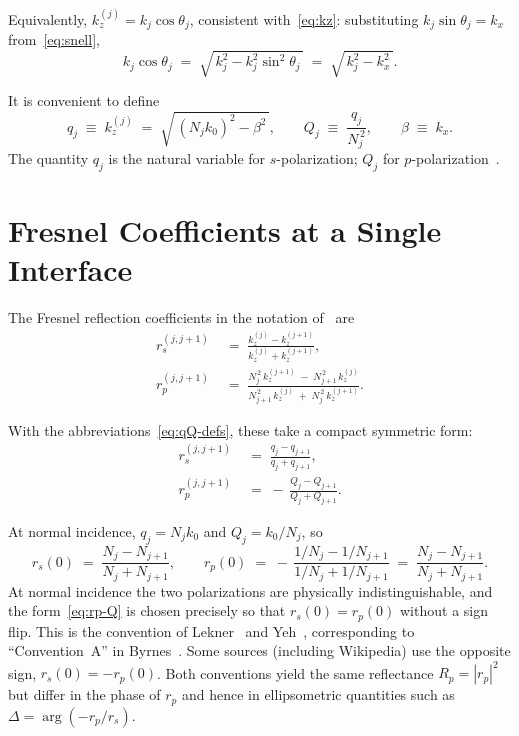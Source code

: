 \documentclass[aps,prb,onecolumn,superscriptaddress,nofootinbib,11pt]{revtex4-2}
\begin{document}
Equivalently, $k_z^{(j)} = k_j\cos\theta_j$, consistent with~\eqref{eq:kz}: substituting $k_j\sin\theta_j = k_x$ from~\eqref{eq:snell},
\begin{equation}
  k_j \cos\theta_j \;=\; \sqrt{\,k_j^2 - k_j^2 \sin^2\theta_j\,} \;=\; \sqrt{\,k_j^2 - k_x^2\,}.
\end{equation}

It is convenient to define
\begin{equation}
  q_j \;\equiv\; k_z^{(j)} \;=\; \sqrt{\,(N_j k_0)^2 - \beta^2\,},
  \qquad
  Q_j \;\equiv\; \frac{q_j}{N_j^{\,2}},
  \qquad
  \beta \;\equiv\; k_x.
  \label{eq:qQ-defs}
\end{equation}
The quantity $q_j$ is the natural variable for $s$-polarization; $Q_j$ for $p$-polarization~\cite{Lekner2016}.

\section{Fresnel Coefficients at a Single Interface}

The Fresnel reflection coefficients in the notation of~\cite{Lekner2016,Yeh2005} are
\begin{align}
  r_s^{(j,j+1)} &\;=\; \frac{k_z^{(j)} - k_z^{(j+1)}}{k_z^{(j)} + k_z^{(j+1)}},
  \label{eq:rs-full}\\[4pt]
  r_p^{(j,j+1)} &\;=\; \frac{N_j^{\,2}\, k_z^{(j+1)} \;-\; N_{j+1}^{\,2}\, k_z^{(j)}}{N_{j+1}^{\,2}\, k_z^{(j)} \;+\; N_j^{\,2}\, k_z^{(j+1)}}.
  \label{eq:rp-full}
\end{align}

With the abbreviations~\eqref{eq:qQ-defs}, these take a compact symmetric form:
\begin{align}
  r_s^{(j,j+1)} &\;=\; \frac{q_j - q_{j+1}}{q_j + q_{j+1}},
  \label{eq:rs-q}\\[4pt]
  r_p^{(j,j+1)} &\;=\; -\,\frac{Q_j - Q_{j+1}}{Q_j + Q_{j+1}}.
  \label{eq:rp-Q}
\end{align}

At normal incidence, $q_j = N_j k_0$ and $Q_j = k_0/N_j$, so
\begin{equation}
  r_s(0) \;=\; \frac{N_j - N_{j+1}}{N_j + N_{j+1}},
  \qquad
  r_p(0) \;=\; -\,\frac{1/N_j - 1/N_{j+1}}{1/N_j + 1/N_{j+1}} \;=\; \frac{N_j - N_{j+1}}{N_j + N_{j+1}}.
\end{equation}
At normal incidence the two polarizations are physically indistinguishable, and the form~\eqref{eq:rp-Q} is chosen precisely so that $r_s(0) = r_p(0)$ without a sign flip. This is the convention of Lekner~\cite{Lekner2016} and Yeh~\cite{Yeh2005}, corresponding to ``Convention~A'' in Byrnes~\cite[Appendix~A]{Byrnes2020}. Some sources (including Wikipedia) use the opposite sign, $r_s(0) = -r_p(0)$. Both conventions yield the same reflectance $R_p = |r_p|^2$ but differ in the phase of $r_p$ and hence in ellipsometric quantities such as $\Delta = \arg(-r_p/r_s)$.
\end{document}
